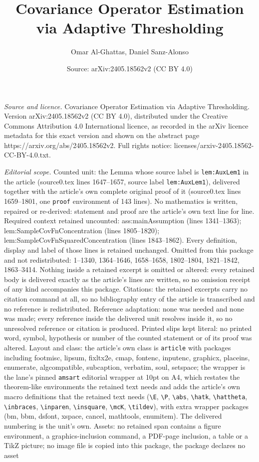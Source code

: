 \documentclass[10pt,a4paper]{amsart}
\title[Covariance Operator Estimation via Adaptive Thresholding]{Covariance Operator Estimation via Adaptive Thresholding}
\author{Omar Al-Ghattas, Daniel Sanz-Alonso}
\date{Source: arXiv:2405.18562v2 (CC BY 4.0)}
\begin{document}
\maketitle

\noindent\emph{Source and licence.} Covariance Operator Estimation via Adaptive Thresholding. Version arXiv:2405.18562v2 (CC BY 4.0), distributed under the Creative Commons Attribution 4.0 International licence, as recorded in the arXiv licence metadata for this exact version and shown on the abstract page https://arxiv.org/abs/2405.18562v2. Full rights notice: licenses/arxiv-2405.18562-CC-BY-4.0.txt.\par\smallskip

\noindent\textit{Editorial scope.} Counted unit: the Lemma whose source label is \texttt{lem:AuxLem1} in the article (source0.tex lines 1647--1657, source label \texttt{lem:AuxLem1}), delivered together with the article's own complete original proof of it (source0.tex lines 1659--1801, one \texttt{proof} environment of 143 lines). No mathematics is written, repaired or re-derived: statement and proof are the article's own text line for line. Required context retained uncounted: ass:mainAssumption (lines 1341--1363); lem:SampleCovFnConcentration (lines 1805--1820); lem:SampleCovFnSquaredConcentration (lines 1843--1862). Every definition, display and label of those lines is retained unchanged. Omitted from this package and not redistributed: 1--1340, 1364--1646, 1658--1658, 1802--1804, 1821--1842, 1863--3414. Nothing inside a retained excerpt is omitted or altered: every retained body is delivered exactly as the article's lines are written, so no omission receipt of any kind accompanies this package. Citations: the retained excerpts carry no citation command at all, so no bibliography entry of the article is transcribed and no reference is redistributed. Reference adaptation: none was needed and none was made; every reference inside the delivered unit resolves inside it, so no unresolved reference or citation is produced. Printed slips kept literal: no printed word, symbol, hypothesis or number of the counted statement or of its proof was altered. Layout and class: the article's own class is \texttt{article} with packages including footmisc, lipsum, fixltx2e, cmap, fontenc, inputenc, graphicx, placeins, enumerate, algcompatible, subcaption, verbatim, soul, setspace; the wrapper is the lane's pinned \texttt{amsart} editorial wrapper at 10pt on A4, which restates the theorem-like environments the retained text needs and adds the article's own macro definitions that the retained text needs (\texttt{\textbackslash E}, \texttt{\textbackslash P}, \texttt{\textbackslash abs}, \texttt{\textbackslash hatk}, \texttt{\textbackslash hattheta}, \texttt{\textbackslash inbraces}, \texttt{\textbackslash inparen}, \texttt{\textbackslash insquare}, \texttt{\textbackslash mcK}, \texttt{\textbackslash tildev}), with extra wrapper packages (bm, bbm, dsfont, xspace, cancel, mathtools, enumitem). The delivered numbering is the unit's own. Assets: no retained span contains a figure environment, a graphics-inclusion command, a PDF-page inclusion, a table or a TikZ picture; no image file is copied into this package, the package declares no asset 
\end{document}

